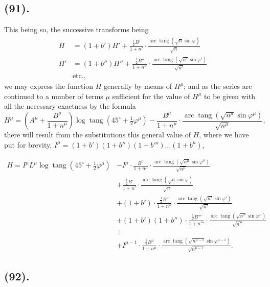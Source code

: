 \documentclass{article}
\begin{document}
\subsection*{(91).}

This being so, the successive transforms being
\[ \begin{aligned} H&=(1+b')H'+\frac{\tfrac{1}{2}B'}{1+n'}\cdot\frac{\operatorname{arc}\operatorname{tang}(\sqrt{n}\sin\varphi)}{\sqrt{n}}\\ H'&=(1+b'')H''+\frac{\tfrac{1}{2}B''}{1+n''}\cdot\frac{\operatorname{arc}\operatorname{tang}(\sqrt{n'}\sin\varphi')}{\sqrt{n'}}\\ &\text{etc.}, \end{aligned} \]
we may express the function $H$ generally by means of $H^{\mu}$; and as the series are continued to a number of terms $\mu$ sufficient for the value of $H^{\mu}$ to be given with all the necessary exactness by the formula
\[ H^{\mu}=\left(A^{\mu}+\frac{B^{\mu}}{1+n^{\mu}}\right)\log\operatorname{tang}(45^{\circ}+\tfrac{1}{2}\varphi^{\mu})-\frac{B^{\mu}}{1+n^{\mu}}\cdot\frac{\operatorname{arc}\operatorname{tang}(\sqrt{n^{\mu}}\sin\varphi^{\mu})}{\sqrt{n^{\mu}}}, \]
there will result from the substitutions this general value of $H$, where we have put for brevity, $I^{\mu}=(1+b')(1+b'')(1+b''')\ldots(1+b^{\mu})$,

\[ \begin{aligned} H=I^{\mu}L^{\mu}\log\operatorname{tang}(45^{\circ}+\tfrac{1}{2}\varphi^{\mu})&-I^{\mu}\cdot\frac{B^{\mu}}{1+n^{\mu}}\cdot\frac{\operatorname{arc}\operatorname{tang}(\sqrt{n^{\mu}}\sin\varphi^{\mu})}{\sqrt{n^{\mu}}}\\ &+\frac{\tfrac{1}{2}B'}{1+n'}\cdot\frac{\operatorname{arc}\operatorname{tang}(\sqrt{n}\sin\varphi)}{\sqrt{n}}\\ &+(1+b')\cdot\frac{\tfrac{1}{2}B''}{1+n''}\cdot\frac{\operatorname{arc}\operatorname{tang}(\sqrt{n'}\sin\varphi')}{\sqrt{n'}}\\ &+(1+b')(1+b'')\cdot\frac{\tfrac{1}{2}B'''}{1+n'''}\cdot\frac{\operatorname{arc}\operatorname{tang}(\sqrt{n''}\sin\varphi'')}{\sqrt{n''}}\\ &\ \vdots\\ &+I^{\mu-1}\cdot\frac{\tfrac{1}{2}B^{\mu}}{1+n^{\mu}}\cdot\frac{\operatorname{arc}\operatorname{tang}(\sqrt{n^{\mu-1}}\sin\varphi^{\mu-1})}{\sqrt{n^{\mu-1}}}. \end{aligned} \]

\subsection*{(92).}
\end{document}

